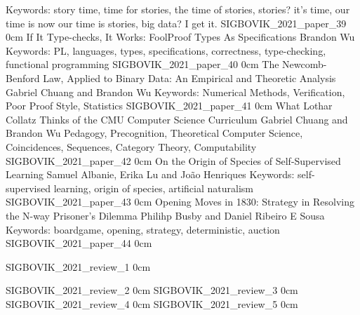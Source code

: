 	{Keywords: story time, time for stories, the time of stories, stories? it's time, our time is now our time is stories, big data? I get it.}
	{SIGBOVIK_2021_paper_39}
	{0cm}
	{}
\addpaper
	{If It Type-checks, It Works: FoolProof Types As Specifications}
	{Brandon Wu}
	{Keywords: PL, languages, types, specifications, correctness, type-checking, functional programming}
	{SIGBOVIK_2021_paper_40}
	{0cm}
	{}
\addpaper
	{The Newcomb-Benford Law, Applied to Binary Data: An Empirical and Theoretic Analysis}
	{Gabriel Chuang and Brandon Wu}
	{Keywords: Numerical Methods, Verification, Poor Proof Style, Statistics}
	{SIGBOVIK_2021_paper_41}
	{0cm}
	{}
\addpaper
	{What Lothar Collatz Thinks of the CMU Computer Science Curriculum}
	{Gabriel Chuang and Brandon Wu}
	{Pedagogy, Precognition, Theoretical Computer Science, Coincidences, Sequences, Category Theory, Computability}
	{SIGBOVIK_2021_paper_42}
	{0cm}
	{}
\addpaper
	{On the Origin of Species of Self-Supervised Learning}
	{Samuel Albanie, Erika Lu and João Henriques}
	{Keywords: self-supervised learning, origin of species, artificial naturalism}
	{SIGBOVIK_2021_paper_43}
	{0cm}
	{}
\addpaper
	{Opening Moves in 1830: Strategy in Resolving the N-way Prisoner’s Dilemma}
	{Philihp Busby and Daniel Ribeiro E Sousa}
	{Keywords: boardgame, opening, strategy, deterministic, auction}
	{SIGBOVIK_2021_paper_44}
	{0cm}
	{}

\addreview
	{SIGBOVIK_2021_review_1}
	{0cm}

\addreview
	{SIGBOVIK_2021_review_2}
	{0cm}
\addreview
	{SIGBOVIK_2021_review_3}
	{0cm}
\addreview
	{SIGBOVIK_2021_review_4}
	{0cm}
\addreview
	{SIGBOVIK_2021_review_5}
	{0cm}
